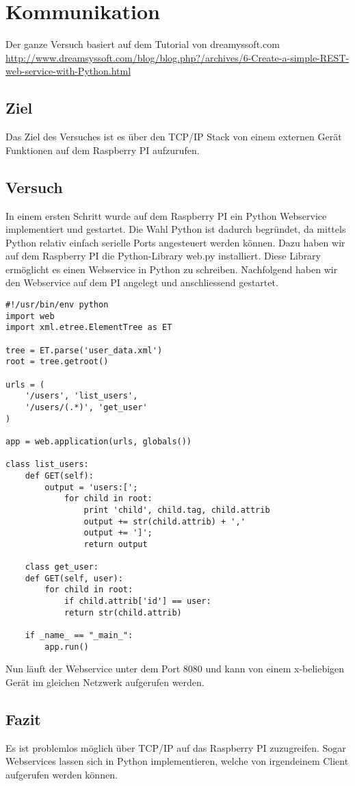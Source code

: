 \section{Kommunikation}
\label{anhang-kommunikation}
Der ganze Versuch basiert auf dem Tutorial von dreamyssoft.com \href{http://www.dreamsyssoft.com/blog/blog.php?/archives/6-Create-a-simple-REST-web-service-with-Python.html}{http://www.dreamsyssoft.com/blog/blog.php?/archives/6-Create-a-simple-REST-web-service-with-Python.html}

\subsection{Ziel}
Das Ziel des Versuches ist es über den TCP/IP Stack von einem externen Gerät Funktionen auf dem Raspberry PI aufzurufen.

\subsection{Versuch}
In einem ersten Schritt wurde auf dem Raspberry PI ein Python Webservice implementiert und gestartet. Die Wahl Python ist dadurch begründet, da mittels Python relativ einfach serielle Ports angesteuert werden können.\newline
\newline
Dazu haben wir auf dem Raspberry PI die Python-Library web.py installiert. Diese Library ermöglicht es einen Webservice in Python zu schreiben. Nachfolgend haben wir den Webservice auf dem PI angelegt und anschliessend gestartet.

\begin{lstlisting}
#!/usr/bin/env python
import web
import xml.etree.ElementTree as ET

tree = ET.parse('user_data.xml')
root = tree.getroot()

urls = (
	'/users', 'list_users',
	'/users/(.*)', 'get_user'
)

app = web.application(urls, globals())

class list_users:        
	def GET(self):
		output = 'users:[';
			for child in root:
				print 'child', child.tag, child.attrib
				output += str(child.attrib) + ','
				output += ']';
				return output

	class get_user:
	def GET(self, user):
		for child in root:
			if child.attrib['id'] == user:
			return str(child.attrib)

	if _name_ == "_main_":
		app.run()
\end{lstlisting}

Nun läuft der Webservice unter dem Port 8080 und kann von einem x-beliebigen Gerät im gleichen Netzwerk aufgerufen werden.
\subsection{Fazit}
Es ist problemlos möglich über TCP/IP auf das Raspberry PI zuzugreifen. Sogar Webservices lassen sich in Python implementieren, welche von irgendeinem Client aufgerufen werden können.

